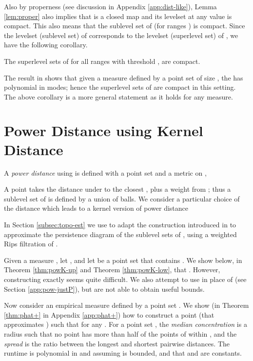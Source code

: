\documentclass[11pt]{myclass}
\begin{document}
Also by properness (see discussion in Appendix \ref{app:dist-like}), Lemma \ref{lem:proper} also implies that  is a closed map and its levelset at any value  is compact. 
This also means that the sublevel set of  (for ranges ) is compact. Since the levelset (sublevel set) of  corresponds to the levelset (superlevel set) of , we have the following corollary.  
\begin{corollary}
The superlevel sets of  for all ranges with threshold , are compact. 
\end{corollary}
The result in \cite{EFR12} shows that given a measure  defined by a point set  of size , the  has polynomial in  modes; hence the superlevel sets of  are compact in this setting.  The above corollary is a more general statement as it holds for any measure.  








\section{Power Distance using Kernel Distance}
\label{sec:powerdistance}
A \emph{power distance} using  is defined with a point set  and a metric  on ,  

A point  takes the distance under  to the closest , plus a weight from ; thus a sublevel set of  is defined by a union of balls.  
We consider a particular choice of the distance  which leads to a kernel version of power distance


In Section \ref{subsec:topo-est} we use  to adapt the construction introduced in \cite{BuchetChazalOudot2013} to approximate the persistence diagram of the sublevel sets of , using a weighted Rips filtration of . 

Given a measure , let , and let  be a point set that contains .  We show below, in Theorem \ref{thm:powK-up} and Theorem \ref{thm:powK-low}, that .  
However, constructing  exactly seems quite difficult.  
We also attempt to use  in place of  (see Section \ref{app:pow-justP}), but are not able to obtain useful bounds.  

Now consider an empirical measure  defined by a point set .  
We show (in Theorem \ref{thm:phat+} in Appendix \ref{app:phat+}) how to construct a point   (that approximates ) such that  
for any .  For a point set , the \emph{median concentration}  is a radius such that no point  has more than half of the points of  within , 
and the \emph{spread}  is the ratio between the longest and shortest pairwise distances.  
The runtime is polynomial in  and  assuming  is bounded, and  that  and  are constants.  
\end{document}
